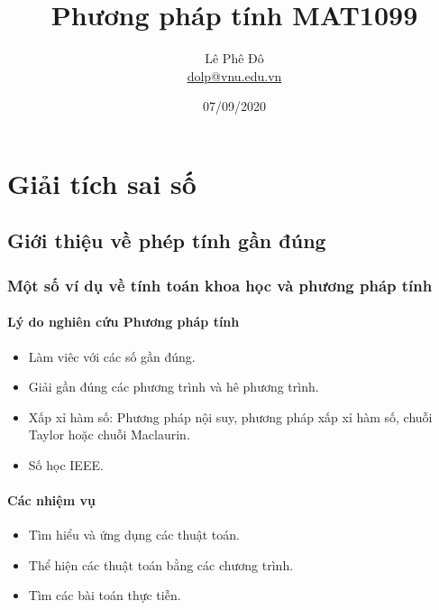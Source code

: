 \documentclass{book}    %
\author{Lê Phê Đô \\ \href{mailto:dolp@vnu.edu.vn}{dolp@vnu.edu.vn}}
\date{07/09/2020}
\title{Phương pháp tính MAT1099}
\def\blankpage{%
      \clearpage%
      \thispagestyle{empty}%
      \addtocounter{page}{-1}%
      \null%
      \clearpage}
\begin{document}
\maketitle

\blankpage

\tableofcontents

\listoffigures

\listoftables


\chapter{Giải tích sai số}

\section{Giới thiệu về phép tính gần đúng}

\subsection{Một số ví dụ về tính toán khoa học và phương pháp tính}

\subsubsection{Lý do nghiên cứu Phương pháp tính}

\begin{itemize}
    \item Làm viêc với các số gần đúng.
    \item Giải gần đúng các phương trình và hê phương trình.
    \item Xấp xỉ hàm số: Phương pháp nội suy, phương pháp xấp xỉ hàm số, chuỗi
    Taylor hoặc chuỗi Maclaurin.
    \item Số học IEEE.
\end{itemize}

\subsubsection{Các nhiệm vụ}

\begin{itemize}
    \item Tìm hiểu và ứng dụng các thuật toán.
    \item Thể hiện các thuật toán bằng các chương trình.
    \item Tìm các bài toán thực tiễn.
\end{itemize}
\end{document}
